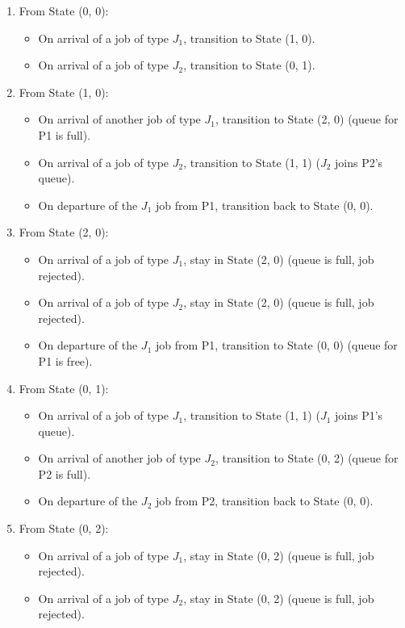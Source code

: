 \documentclass{article}
\begin{document}
\begin{enumerate}
  \item From State (0, 0):
  \begin{itemize}
    \item On arrival of a job of type $J_1$, transition to State (1, 0).
    \item On arrival of a job of type $J_2$, transition to State (0, 1).
  \end{itemize}
  \item From State (1, 0):
  \begin{itemize}
    \item On arrival of another job of type $J_1$, transition to State (2, 0) (queue for P1 is full).
    \item On arrival of a job of type $J_2$, transition to State (1, 1) ($J_2$ joins P2's queue).
    \item On departure of the $J_1$ job from P1, transition back to State (0, 0).
  \end{itemize}
  \item From State (2, 0):
  \begin{itemize}
    \item On arrival of a job of type $J_1$, stay in State (2, 0) (queue is full, job rejected).
    \item On arrival of a job of type $J_2$, stay in State (2, 0) (queue is full, job rejected).
    \item On departure of the $J_1$ job from P1, transition to State (0, 0) (queue for P1 is free).
  \end{itemize}
  \item From State (0, 1):
  \begin{itemize}
    \item On arrival of a job of type $J_1$, transition to State (1, 1) ($J_1$ joins P1's queue).
    \item On arrival of another job of type $J_2$, transition to State (0, 2) (queue for P2 is full).
    \item On departure of the $J_2$ job from P2, transition back to State (0, 0).
  \end{itemize}
  \item From State (0, 2):
  \begin{itemize}
    \item On arrival of a job of type $J_1$, stay in State (0, 2) (queue is full, job rejected).
    \item On arrival of a job of type $J_2$, stay in State (0, 2) (queue is full, job rejected).

\end{itemize}
\end{enumerate}
\end{document}
